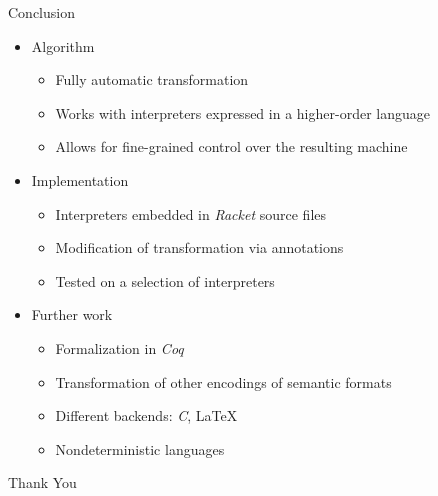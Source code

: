 \documentclass{beamer}
\begin{document}
\begin{frame}{Conclusion}
  \begin{itemize}
    \item Algorithm
    \begin{itemize}
      \item Fully automatic transformation
      \item Works with interpreters expressed in a higher-order language
      \item Allows for fine-grained control over the resulting machine
    \end{itemize}
    \pause
    \item Implementation
    \begin{itemize}
      \item Interpreters embedded in \textit{Racket} source files
      \item Modification of transformation via annotations
      \item Tested on a selection of interpreters
    \end{itemize}
    \pause
    \item Further work
    \begin{itemize}
      \item Formalization in \textit{Coq}
      \item Transformation of other encodings of semantic formats
      \item Different backends: \textit{C}, \LaTeX
      \item Nondeterministic languages
    \end{itemize}
  \end{itemize}  
\end{frame}

\begin{frame}
  \centering
  \huge Thank You
\end{frame}
\end{document}
